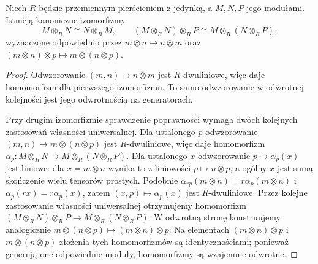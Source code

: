 \begin{twierdzenie}
\label{aa:tw:tensor-sym-assoc}
Niech $R$ będzie przemiennym pierścieniem z jedynką,
a $M,N,P$ jego modułami. Istnieją kanoniczne izomorfizmy
\[
 M\otimes_RN\cong N\otimes_RM,
 \qquad (M\otimes_RN)\otimes_RP\cong
 M\otimes_R(N\otimes_RP),
\]
wyznaczone odpowiednio przez $m\otimes n\mapsto n\otimes m$
oraz $(m\otimes n)\otimes p\mapsto m\otimes(n\otimes p)$.
\end{twierdzenie}
\begin{proof}
Odwzorowanie $(m,n)\mapsto n\otimes m$ jest
$R$-dwuliniowe, więc daje homomorfizm dla pierwszego
izomorfizmu. To samo odwzorowanie w odwrotnej kolejności
jest jego odwrotnością na generatorach.

Przy drugim izomorfizmie sprawdzenie poprawności wymaga
dwóch kolejnych zastosowań własności uniwersalnej.
Dla ustalonego $p$ odwzorowanie $(m,n)\mapsto
m\otimes(n\otimes p)$ jest $R$-dwuliniowe, więc
daje homomorfizm $\alpha_p:M\otimes_RN\to
M\otimes_R(N\otimes_RP)$. Dla ustalonego $x$ odwzorowanie
$p\mapsto\alpha_p(x)$ jest liniowe: dla
$x=m\otimes n$ wynika to z liniowości
$p\mapsto n\otimes p$, a ogólny $x$ jest sumą
skończenie wielu tensorów prostych. Podobnie
$\alpha_{rp}(m\otimes n)=r\alpha_p(m\otimes n)$
i $\alpha_p(rx)=r\alpha_p(x)$, zatem
$(x,p)\mapsto\alpha_p(x)$ jest $R$-dwuliniowe.
Przez kolejne zastosowanie własności uniwersalnej
otrzymujemy homomorfizm
$(M\otimes_RN)\otimes_RP\to M\otimes_R(N\otimes_RP)$.
W odwrotną stronę konstruujemy analogicznie
$m\otimes(n\otimes p)\mapsto(m\otimes n)\otimes p$.
Na elementach $(m\otimes n)\otimes p$ i
$m\otimes(n\otimes p)$ złożenia tych homomorfizmów
są identycznościami; ponieważ generują one odpowiednie
moduły, homomorfizmy są wzajemnie odwrotne.
\end{proof}

